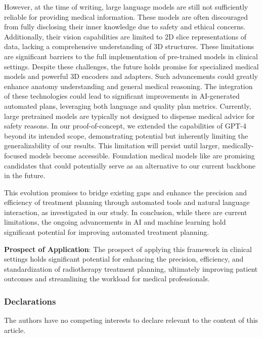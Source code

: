 \documentclass[runningheads]{llncs}
\begin{document}
However, at the time of writing, large language models are still not sufficiently reliable for providing medical information. These models are often discouraged from fully disclosing their inner knowledge due to safety and ethical concerns. Additionally, their vision capabilities are limited to 2D slice representations of data, lacking a comprehensive understanding of 3D structures. These limitations are significant barriers to the full implementation of pre-trained models in clinical settings. Despite these challenges, the future holds promise for specialized medical models and powerful 3D encoders and adapters. Such advancements could greatly enhance anatomy understanding and general medical reasoning. The integration of these technologies could lead to significant improvements in AI-generated automated plans, leveraging both language and quality plan metrics. Currently, large pretrained models are typically not designed to dispense medical advice for safety reasons. In our proof-of-concept, we extended the capabilities of GPT-4 beyond its intended scope, demonstrating potential but inherently limiting the generalizability of our results. This limitation will persist until larger, medically-focused models become accessible. Foundation medical models like \cite{med-llama, med-sam,yagnik2024medlm} are promising candidates that could potentially serve as an alternative to our current backbone in the future.

This evolution promises to bridge existing gaps and enhance the precision and efficiency of treatment planning through automated tools and natural language interaction, as investigated in our study. In conclusion, while there are current limitations, the ongoing advancements in AI and machine learning hold significant potential for improving automated treatment planning.

\textbf{Prospect of Application}: The prospect of applying this framework in clinical settings holds significant potential for enhancing the precision, efficiency, and standardization of radiotherapy treatment planning, ultimately improving patient outcomes and streamlining the workload for medical professionals.

\subsubsection*{Declarations}
The authors have no competing interests to declare relevant to the content of this article.
\end{document}
